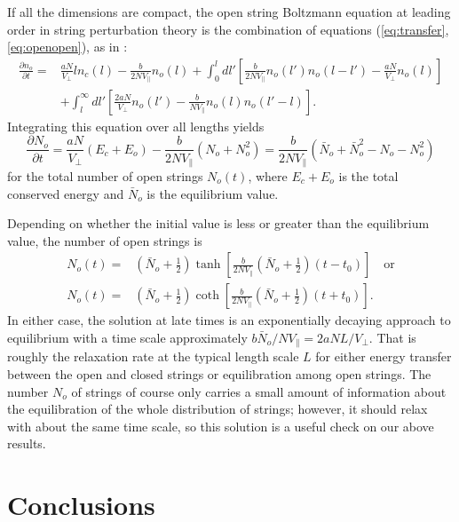\documentclass[a4paper,11pt]{article}
\begin{document}
If all the dimensions are compact, the open string Boltzmann equation
at leading order in string perturbation theory is the combination of
equations (\ref{eq:transfer},\ref{eq:openopen}), as in \cite{Lee:1997iz}:
\begin{equation}\begin{split}
\frac{\partial n_o}{\partial t} =& \frac{aN}{V_\perp} ln_c(l) -
\frac{b}{2NV_\|} n_o(l)+\int_0^ldl'\left[\frac{b}{2NV_\|}n_o(l')n_o(l-l')
-\frac{aN}{V_\perp}n_o(l)\right]\\ 
&+\int_l^\infty dl'\left[\frac{2aN}{V_\perp}n_o(l') 
-\frac{b}{NV_\|}n_o(l)n_o(l'-l)\right] .
\end{split}\end{equation}
Integrating this equation over all lengths yields 
\begin{equation}
\frac{\partial N_o}{\partial t} = \frac{aN}{V_\perp}(E_c+E_o)-\frac{b}{2NV_\|}
(N_o+N_o^2)= \frac{b}{2NV_\|}\left(\bar{N}_o+\bar{N}_o^2-N_o-N_o^2\right)
\end{equation}
for the total number of open strings $N_o(t)$, where $E_c+E_o$ is the total
conserved energy and $\bar{N}_o$ is the equilibrium value.

Depending on whether the initial value is less or greater than the equilibrium
value, the number of open strings is
\begin{equation}\begin{split}
N_o(t) =& \left(\bar{N}_o+\frac 12\right)\tanh\left[\frac{b}{2NV_\|}
\left(\bar{N}_o+\frac 12\right)(t-t_0)\right]\quad\text{or}\\
N_o(t) =&\left(\bar{N}_o+\frac 12\right)\coth\left[\frac{b}{2NV_\|}
\left(\bar{N}_o+\frac 12\right)(t+t_0)\right] .\end{split}\end{equation}
In either case, the solution at late times is an exponentially decaying 
approach to equilibrium with a time scale approximately 
$b\bar{N}_o/NV_\| = 2aNL/V_\perp$. That is roughly the relaxation rate
at the typical length scale $L$
for either energy transfer between the open and closed strings or 
equilibration among open strings. The number $N_o$ of strings of course only 
carries a small amount of information about the equilibration of the whole
distribution of strings; however, it should relax with about the same time
scale, so this solution is a useful check on our above results.


\section{Conclusions}\label{sec:conclusions}
\end{document}
